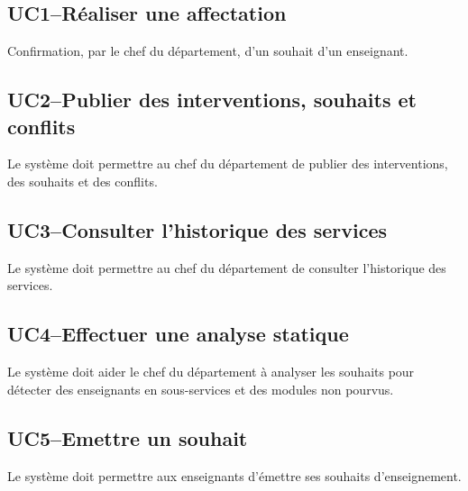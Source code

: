 

\subsection{UC1\---Réaliser une affectation}
\begin{requirement}[Affectation]
	Confirmation, par le chef du département, d'un souhait d'un enseignant.
\end{requirement}

\subsection{UC2\---Publier des interventions, souhaits et conflits}
\begin{requirement}
	Le système doit permettre au chef du département de publier des interventions, des souhaits et des conflits.
\end{requirement}

\subsection{UC3\---Consulter l'historique des services}
\begin{requirement}[Historique]
	Le système doit permettre au chef du département de consulter l'historique des services.
\end{requirement}

\subsection{UC4\---Effectuer une analyse statique}
\begin{requirement}[Analyse]
	Le système doit aider le chef du département à analyser les souhaits pour détecter des enseignants en sous-services et des modules non pourvus. 
\end{requirement}

\subsection{UC5\---Emettre un souhait}
\begin{requirement}
	Le système doit permettre aux enseignants d'émettre ses souhaits d'enseignement.
\end{requirement}


